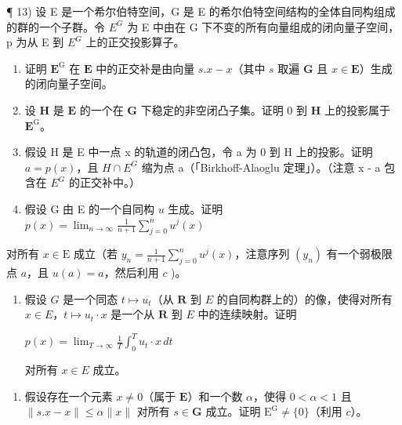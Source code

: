 ¶ 13) 设 E 是一个希尔伯特空间，G 是 E 的希尔伯特空间结构的全体自同构组成的群的一个子群。令 \(E^{G}\) 为 E 中由在 G 下不变的所有向量组成的闭向量子空间，p 为从 E 到 \(E^{G}\) 上的正交投影算子。

\begin{enumerate}
\def\labelenumi{\alph{enumi})}
\item
  证明 \(\mathbf{E}^{\mathrm{G}}\) 在 \(\mathbf{E}\) 中的正交补是由向量 \(s.x - x\)（其中 \(s\) 取遍 \(\mathbf{G}\) 且 \(x \in \mathbf{E}\)）生成的闭向量子空间。
\item
  设 \(\mathbf{H}\) 是 \(\mathbf{E}\) 的一个在 \(\mathbf{G}\) 下稳定的非空闭凸子集。证明 0 到 \(\mathbf{H}\) 上的投影属于 \(\mathbf{E}^{\mathrm{G}}\)。
\item
  假设 H 是 E 中一点 x 的轨道的闭凸包，令 a 为 0 到 H 上的投影。证明 \(a = p(x)\)，且 \(H \cap E^{G}\) 缩为点 a（「Birkhoff-Alaoglu 定理」）。（注意 x - a 包含在 \(E^{G}\) 的正交补中。）
\item
  假设 G 由 E 的一个自同构 \(u\) 生成。证明 \(p(x) = \lim_{n\to \infty}\frac{1}{n + 1}\sum_{j = 0}^{n}u^{j}(x)\)
\end{enumerate}

对所有 \(x \in \mathrm{E}\) 成立（若 \(y_{n} = \frac{1}{n + 1} \sum_{j=0}^{n} u^{j}(x)\)，注意序列 \((y_{n})\) 有一个弱极限点 \(a\)，且 \(u(a) = a\)，然后利用 \(c\) )。

\begin{enumerate}
\def\labelenumi{\alph{enumi})}
\setcounter{enumi}{4}
\tightlist
\item
  假设 \(G\) 是一个同态 \(t \mapsto u_t\)（从 \(\mathbf{R}\) 到 \(E\) 的自同构群上的）的像，使得对所有 \(x \in E\)，\(t \mapsto u_t \cdot x\) 是一个从 \(\mathbf{R}\) 到 \(E\) 中的连续映射。证明

\(p(x) = \lim_{T \to \infty} \frac{1}{T} \int_{0}^{T} u_t \cdot x \, dt\)

对所有 \(x \in E\) 成立。

\end{enumerate}

\begin{enumerate}
\def\labelenumi{\alph{enumi})}
\setcounter{enumi}{5}
\tightlist
\item
  假设存在一个元素 \(x \neq 0\)（属于 \(\mathbf{E}\)）和一个数 \(\alpha\)，使得 \(0 < \alpha < 1\) 且 \(\| s.x - x\| \leqslant \alpha \| x\|\) 对所有 \(s \in \mathbf{G}\) 成立。证明 \(\mathrm{E}^{\mathrm{G}} \neq \{0\}\)（利用 \(c\)）。
\end{enumerate}

